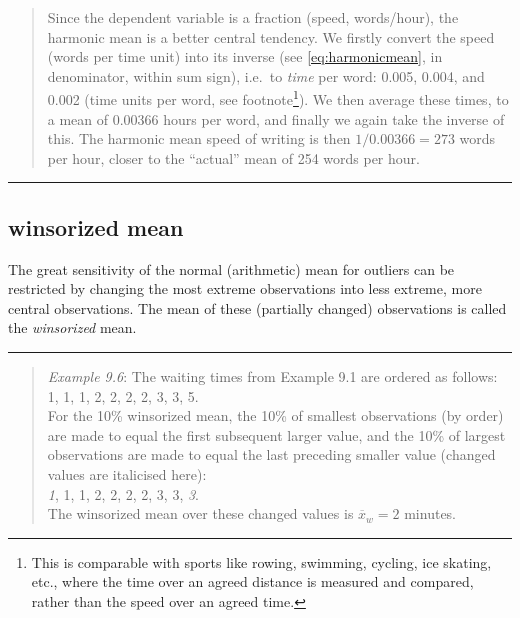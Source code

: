 \documentclass[
]{book}
\begin{document}
\begin{quote}
Since the dependent variable is a fraction (speed, words/hour),
the harmonic mean is a better central tendency. We firstly convert
the speed (words per time unit) into its inverse
(see \eqref{eq:harmonicmean}, in denominator, within sum sign),
i.e.~to \emph{time} per word: 0.005, 0.004, and 0.002 (time units per
word, see footnote\footnote{This is comparable with sports like rowing, swimming, cycling, ice skating, etc., where
  the time over an agreed distance is measured and compared, rather than the speed over an
  agreed time.}). We then average these times, to
a mean of 0.00366 hours per word, and finally we again take the
inverse of this. The harmonic mean speed of writing is then \(1/0.00366=273\)
words per hour, closer to the ``actual'' mean of 254 words per hour.
\end{quote}

\begin{center}\rule{0.5\linewidth}{0.5pt}\end{center}

\hypertarget{winsorized-mean}{%
\subsection{winsorized mean}\label{winsorized-mean}}

The great sensitivity of the normal (arithmetic) mean for
outliers can be restricted by changing the most extreme observations
into less extreme, more central observations. The
mean of these (partially changed) observations is called the
\emph{winsorized} mean.

\begin{center}\rule{0.5\linewidth}{0.5pt}\end{center}

\begin{quote}
\emph{Example 9.6}: The waiting times from Example 9.1
are ordered as follows:\\
1, 1, 1, 2, 2, 2, 2, 3, 3, 5.\\
For the 10\% winsorized mean, the 10\% of smallest observations (by
order) are made to equal the first subsequent larger value, and
the 10\% of largest observations are made to equal the last
preceding smaller value (changed values are italicised here):\\
\emph{1}, 1, 1, 2, 2, 2, 2, 3, 3, \emph{3}.\\
The winsorized mean over these changed values is
\(\overline{x}_w=2\) minutes.
\end{quote}
\end{document}

